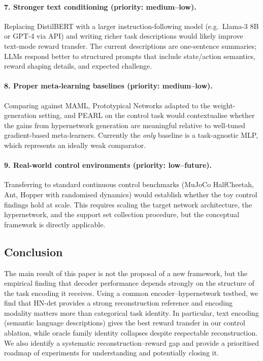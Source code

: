 \paragraph{7. Stronger text conditioning (priority: medium--low).}
Replacing DistilBERT with a larger instruction-following model (e.g.\ Llama-3 8B or GPT-4 via API) and writing richer task descriptions would likely improve text-mode reward transfer.
The current descriptions are one-sentence summaries; LLMs respond better to structured prompts that include state/action semantics, reward shaping details, and expected challenge.

\paragraph{8. Proper meta-learning baselines (priority: medium--low).}
Comparing against MAML, Prototypical Networks adapted to the weight-generation setting, and PEARL on the control task would contextualise whether the gains from hypernetwork generation are meaningful relative to well-tuned gradient-based meta-learners.
Currently the \emph{only} baseline is a task-agnostic MLP, which represents an ideally weak comparator.

\paragraph{9. Real-world control environments (priority: low--future).}
Transferring to standard continuous control benchmarks (MuJoCo HalfCheetah, Ant, Hopper with randomised dynamics) would establish whether the toy control findings hold at scale.
This requires scaling the target network architecture, the hypernetwork, and the support set collection procedure, but the conceptual framework is directly applicable.

\subsection{Conclusion}

The main result of this paper is not the proposal of a new framework, but the empirical finding that decoder performance depends strongly on the structure of the task encoding it receives.
Using a common encoder--hypernetwork testbed, we find that HN-det provides a strong reconstruction reference and encoding modality matters more than categorical task identity.
In particular, text encoding (semantic language descriptions) gives the best reward transfer in our control ablation, while oracle family identity collapses despite respectable reconstruction.
We also identify a systematic reconstruction--reward gap and provide a prioritised roadmap of experiments for understanding and potentially closing it.
